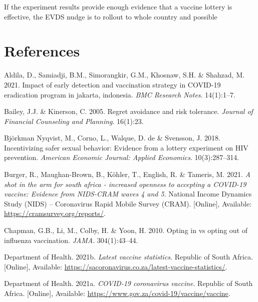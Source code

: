 \documentclass[11pt,preprint, authoryear]{elsarticle}
\numberwithin{equation}{section}
\numberwithin{figure}{section}
\numberwithin{table}{section}
\newlength{\cslhangindent}
\newenvironment{CSLReferences}%
  {\setlength{\parindent}{0pt}%
  \everypar{\setlength{\hangindent}{\cslhangindent}}\ignorespaces}%
  {\par}
\begin{document}
If the experiment results provide enough evidence that a vaccine lottery
is effective, the EVDS nudge is to rollout to whole country and possible

\newpage

\hypertarget{references}{%
\section*{References}\label{references}}

\hypertarget{refs}{}
\begin{CSLReferences}{1}{0}
\leavevmode\hypertarget{ref-erad}{}%
Aldila, D., Samiadji, B.M., Simorangkir, G.M., Khosnaw, S.H. \& Shahzad,
M. 2021. Impact of early detection and vaccination strategy in COVID-19
eradication program in jakarta, indonesia. \emph{BMC Research Notes}.
14(1):1--7.

\leavevmode\hypertarget{ref-regret}{}%
Bailey, J.J. \& Kinerson, C. 2005. Regret avoidance and risk tolerance.
\emph{Journal of Financial Counseling and Planning}. 16(1):23.

\leavevmode\hypertarget{ref-hiv}{}%
Björkman Nyqvist, M., Corno, L., Walque, D. de \& Svensson, J. 2018.
Incentivizing safer sexual behavior: Evidence from a lottery experiment
on HIV prevention. \emph{American Economic Journal: Applied Economics}.
10(3):287--314.

\leavevmode\hypertarget{ref-cram}{}%
Burger, R., Maughan-Brown, B., Köhler, T., English, R. \& Tameris, M.
2021. \emph{A shot in the arm for south africa - increased openness to
accepting a COVID-19 vaccine: Evidence from NIDS-CRAM waves 4 and 5}.
National Income Dynamics Study (NIDS) -- Coronavirus Rapid Mobile Survey
(CRAM). {[}Online{]}, Available: \url{https://cramsurvey.org/reports/}.

\leavevmode\hypertarget{ref-opt}{}%
Chapman, G.B., Li, M., Colby, H. \& Yoon, H. 2010. Opting in vs opting
out of influenza vaccination. \emph{JAMA}. 304(1):43--44.

\leavevmode\hypertarget{ref-stat}{}%
Department of Health. 2021b. \emph{Latest vaccine statistics}. Republic
of South Africa. {[}Online{]}, Available:
\url{https://sacoronavirus.co.za/latest-vaccine-statistics/}.

\leavevmode\hypertarget{ref-herd}{}%
Department of Health. 2021a. \emph{COVID-19 coronavirus vaccine}.
Republic of South Africa. {[}Online{]}, Available:
\url{https://www.gov.za/covid-19/vaccine/vaccine}.


\end{CSLReferences}
\end{document}
